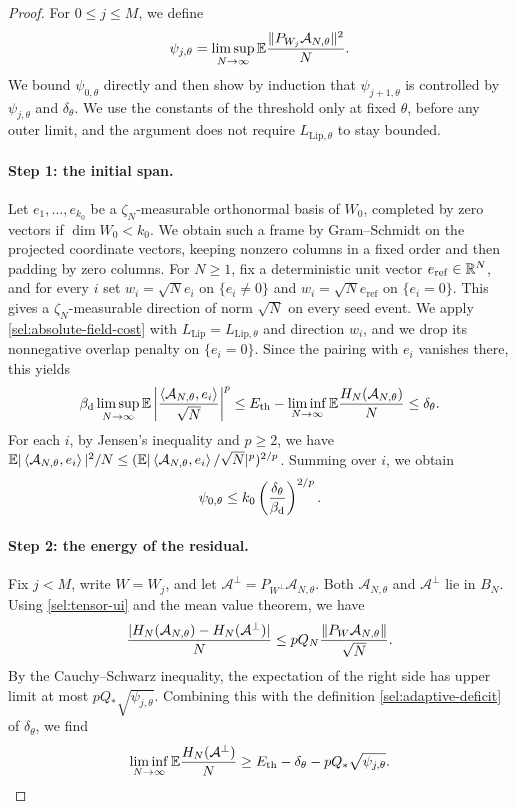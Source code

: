\begin{proof}
For $0\le j\le M$, we define
\[
 \psi_{j,\theta}=\limsup_{N\to\infty}
 \mathbb E\frac{\lVert P_{W_j}\mathcal A_{N,\theta}\rVert^2}N.
\]
We bound $\psi_{0,\theta}$ directly and then show by induction that
$\psi_{j+1,\theta}$ is controlled by $\psi_{j,\theta}$ and $\delta_\theta$.
We use the constants of the threshold only at fixed $\theta$, before any
outer limit, and the argument does not require $L_{\mathrm{Lip},\theta}$ to stay
bounded.

\paragraph{Step 1: the initial span.}
Let $e_1,\dots,e_{k_0}$ be a $\zeta_N$-measurable orthonormal basis of
$W_0$, completed by zero vectors if $\dim W_0<k_0$. We obtain such a frame by Gram--Schmidt on the projected coordinate vectors,
keeping nonzero columns in a fixed order and then padding by zero columns. For $N\ge1$, fix a
deterministic unit vector $e_{\mathrm{ref}}\in\mathbb R^N$, and for every $i$ set
$w_i=\sqrt N e_i$ on $\{e_i\ne0\}$ and
$w_i=\sqrt N e_{\mathrm{ref}}$ on $\{e_i=0\}$. This gives a
$\zeta_N$-measurable direction of norm $\sqrt N$ on every seed event.
We apply \cref{sel:absolute-field-cost} with
$L_{\mathrm{Lip}}=L_{\mathrm{Lip},\theta}$ and direction $w_i$, and we drop
its nonnegative overlap penalty on $\{e_i=0\}$. Since the pairing with
$e_i$ vanishes there, this yields
\[
 \beta_{\mathrm d}\limsup_{N\to\infty}\mathbb E\left|\frac{\left\langle\mathcal A_{N,\theta},e_i\right\rangle}{\sqrt N}\right|^p
 \le E_{\mathrm{th}}-\liminf_{N\to\infty}\mathbb E\frac{H_N(\mathcal A_{N,\theta})}N
 \le\delta_\theta.
\]
For each $i$, by Jensen's inequality and $p\ge2$, we have
$\mathbb E|\left\langle\mathcal A_{N,\theta},e_i\right\rangle|^2/N
\le(\mathbb E|\left\langle\mathcal A_{N,\theta},e_i\right\rangle/\sqrt N|^p)^{2/p}$. Summing over $i$,
we obtain
\begin{equation}\label{sel:adaptive-initial-estimate}
 \psi_{0,\theta}\le k_0\left(\frac{\delta_\theta}{\beta_{\mathrm d}}\right)^{2/p}.
\end{equation}

\paragraph{Step 2: the energy of the residual.}
Fix $j<M$, write $W=W_j$, and let
$\mathcal A^\perp=P_{W^\perp}\mathcal A_{N,\theta}$. Both
$\mathcal A_{N,\theta}$ and $\mathcal A^\perp$ lie in $B_N$. Using \eqref{sel:tensor-ui} and the mean value theorem, we have
\[
 \frac{|H_N(\mathcal A_{N,\theta})-H_N(\mathcal A^\perp)|}N
 \le pQ_N\frac{\lVert P_W\mathcal A_{N,\theta}\rVert}{\sqrt N}.
\]
By the Cauchy--Schwarz inequality, the expectation of the right side has
upper limit at most $pQ_*\sqrt{\psi_{j,\theta}}$. Combining this with the
definition \eqref{sel:adaptive-deficit} of $\delta_\theta$, we find
\begin{equation}\label{eq:residual-energy-lower}
 \liminf_{N\to\infty}\mathbb E\frac{H_N(\mathcal A^\perp)}N
 \ge E_{\mathrm{th}}-\delta_\theta-pQ_*\sqrt{\psi_{j,\theta}}.
\end{equation}


\end{proof}
